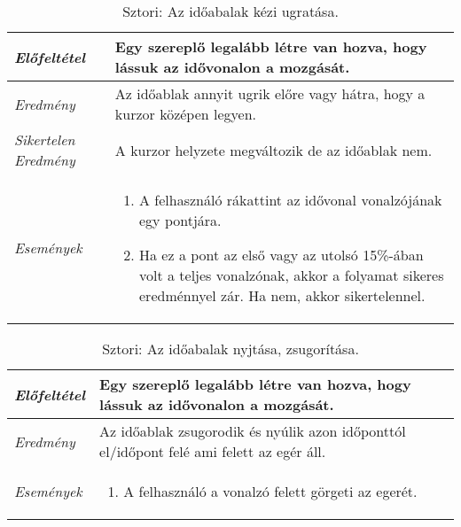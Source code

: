 \begin{table}[H]
	\centering
	\begin{tabular}{ | m{} | m{} | }
		\hline
		\emph{Előfeltétel} & Egy szereplő legalább létre van hozva, hogy lássuk az idővonalon a mozgását.\\
		\hline
		\emph{Eredmény} & Az időablak annyit ugrik előre vagy hátra, hogy a kurzor középen legyen. \\
		\hline
		\emph{Sikertelen Eredmény} & A kurzor helyzete megváltozik de az időablak nem.  \\
		\hline
		\hline
		\emph{Események} &

		\begin{enumerate}[itemsep=-1ex]
			\item A felhasználó rákattint az idővonal vonalzójának egy pontjára.
			\item Ha ez a pont az első vagy az utolsó 15\%-ában volt a teljes vonalzónak, akkor a folyamat sikeres eredménnyel zár. Ha nem, akkor sikertelennel.
		\end{enumerate}
		\\
		\hline
	\end{tabular}
	\caption{Sztori: Az időabalak kézi ugratása.}
	\label{tab:story-timeline-manual-jump}
\end{table}

\begin{table}[H]
	\centering
	\begin{tabular}{ | m{} | m{} | }
		\hline
		\emph{Előfeltétel} & Egy szereplő legalább létre van hozva, hogy lássuk az idővonalon a mozgását.\\
		\hline
		\emph{Eredmény} & Az időablak zsugorodik és nyúlik azon időponttól el/időpont felé ami felett az egér áll. \\
		\hline
		\hline
		\emph{Események} &

		\begin{enumerate}[itemsep=-1ex]
			\item A felhasználó a vonalzó felett görgeti az egerét.
		\end{enumerate}
		\\
		\hline
	\end{tabular}
	\caption{Sztori: Az időabalak nyjtása, zsugorítása.}
	\label{tab:story-timeline-zoom}
\end{table}
